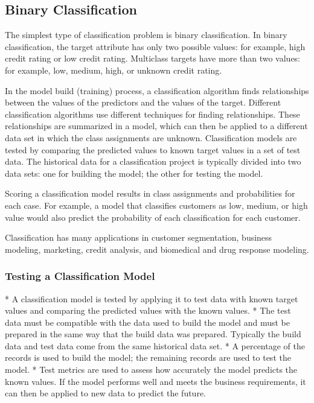 \subsection{Binary Classification}
The simplest type of classification problem is binary classification. In binary classification, the target attribute has only two possible values: for example, high credit rating or low credit rating. Multiclass targets have more than two values: for example, low, medium, high, or unknown credit rating.

In the model build (training) process, a classification algorithm finds relationships between the values of the predictors and the values of the target. Different classification algorithms use different techniques for finding relationships. These relationships are summarized in a model, which can then be applied to a different data set in which the class assignments are unknown.
Classification models are tested by comparing the predicted values to known target values in a set of test data. The historical data for a classification project is typically divided into two data sets: one for building the model; the other for testing the model.

Scoring a classification model results in class assignments and probabilities for each case. For example, a model that classifies customers as low, medium, or high value would also predict the probability of each classification for each customer.

Classification has many applications in customer segmentation, business modeling, marketing, credit analysis, and biomedical and drug response modeling.

\subsubsection{Testing a Classification Model}

*  A classification model is tested by applying it to test data with known target values and comparing the predicted values with the known values.
*  The test data must be compatible with the data used to build the model and must be prepared in the same way that the build data was prepared. Typically the build data and test data come from the same historical data set. *  A percentage of the records is used to build the model; the remaining records are used to test the model.
*  Test metrics are used to assess how accurately the model predicts the known values. If the model performs well and meets the business requirements, it can then be applied to new data to predict the future.


